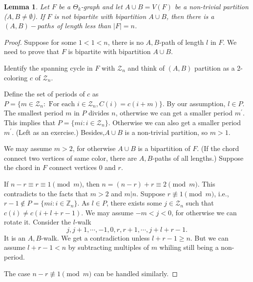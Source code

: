 \documentclass{article}
\newtheorem{lemma}[theorem]{Lemma}
\theoremstyle{definition}
\begin{document}
\begin{lemma}
    Let $F$ be a $\Theta_k$-graph and let $A\cup B=V(F)$ be a non-trivial partition ($A,B\neq \emptyset$). If $F$ is not bipartite with bipartition $A\cup B$, then there is a $(A,B)-paths$ of length less than  $|F|=n$.
\end{lemma}
\begin{proof}
Suppose for some $1 <1 < n$, there is no $A, B$-path of length $l$ in $F$. We need to prove that
$F$ is bipartite with bipartition $A \cup B$.

Identify the spanning cycle in $F$ with $\mathcal{Z}_n$ and think of $(A, B)$ partition as a 2-coloring $c$ of $\mathcal{Z}_n$.


Define the set of periods of $c$ as $P= \{ m \in  \mathcal{Z}_n : \text{ For each } i \in \mathcal{Z}_n, C(i)
=c(i + m)\}$. By our
assumption, $l\in P$. The smallest period $m$ in $P$ divides $n$, otherwise we can get a smaller period $m^\prime$. This implies that $P = \{mi : i \in  \mathcal{Z}_n\}$. Otherwise we can also get a smaller period $m^\prime$. (Left as
an exercise.) Besides,$A \cup B$ is a non-trivial partition, so $m > 1$.


We may assume $m > 2$, for otherwise $A \cup B$ is a bipartition of $F$. (If the chord connect two
vertices of same color, there are $A, B$-paths of all lengths.) Suppose the chord in $F$ connect vertices
0 and $r$.


If $n-r \equiv {r} \equiv 1 \pmod {m}$, then $n = (n -r) + r \equiv 2 \pmod {m}$. This contradicts to the facts that
$m > 2$ and $m|n$.
Suppose $r \not \equiv 1 \pmod {m}$, i.e., $r-1 \notin  P = \{mi: i \in \mathbb{Z}_n\}$. As $l \in  P$, there exists some $j \in \mathcal{Z}_n$ such that $c(i) \neq c(i+ l+r- 1)$. We may assume
$-m < j < 0$, for otherwise we can rotate it.
Consider the $l$-walk
$$j,j+1,\cdots ,-1,0,r,r+1,\cdots,j+l+r-1.$$
It is an $A, B$-walk. We get a contradiction unless $l+r-1\geq n$. But we can assume $l+r-1< n$
by subtracting multiples of $m$ whiling still being a non-period.

The case $n -r \not \equiv 1 \pmod {m}$ can be handled similarly.

\end{proof}
\end{document}
